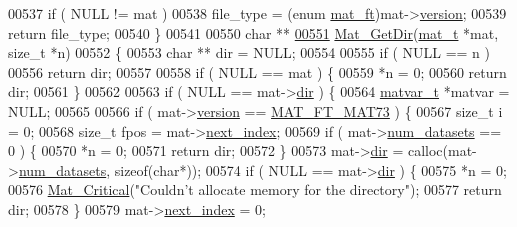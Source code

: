 \begin{DoxyCode}
{{{{{{{{{{{{{{{{{{{00537     \textcolor{keywordflow}{if} ( NULL != mat )
00538         file\_type = (\textcolor{keyword}{enum} \hyperlink{group___m_a_t_gad03442b8378999189d510e3745c702b7}{mat\_ft})mat->\hyperlink{struct__mat__t_a729c2bc0afc97485057a5af425635b1a}{version};
00539     \textcolor{keywordflow}{return} file\_type;
00540 \}
00541 
00550 \textcolor{keywordtype}{char} **
\hyperlink{group___m_a_t_ga7c0d94860d782366ab93d9b6b068eaea}{00551} \hyperlink{group___m_a_t_ga7c0d94860d782366ab93d9b6b068eaea}{Mat\_GetDir}(\hyperlink{struct__mat__t}{mat\_t} *mat, \textcolor{keywordtype}{size\_t} *n)
00552 \{
00553     \textcolor{keywordtype}{char} ** dir = NULL;
00554 
00555     \textcolor{keywordflow}{if} ( NULL == n )
00556         \textcolor{keywordflow}{return} dir;
00557 
00558     \textcolor{keywordflow}{if} ( NULL == mat ) \{
00559         *n = 0;
00560         \textcolor{keywordflow}{return} dir;
00561     \}
00562 
00563     \textcolor{keywordflow}{if} ( NULL == mat->\hyperlink{struct__mat__t_a1bc6c604459d0787801d5e53d365684c}{dir} ) \{
00564         \hyperlink{group___m_a_t_structmatvar__t}{matvar\_t} *matvar = NULL;
00565 
00566         \textcolor{keywordflow}{if} ( mat->\hyperlink{struct__mat__t_a729c2bc0afc97485057a5af425635b1a}{version} == \hyperlink{group___m_a_t_ggad03442b8378999189d510e3745c702b7a765c5d1d5038947646260dc82483517e}{MAT\_FT\_MAT73} ) \{
00567             \textcolor{keywordtype}{size\_t} i = 0;
00568             \textcolor{keywordtype}{size\_t} fpos = mat->\hyperlink{struct__mat__t_a0163a12f9735356723bb604992639d9e}{next\_index};
00569             \textcolor{keywordflow}{if} ( mat->\hyperlink{struct__mat__t_af37d0ba323e65edb27ecd5a2f766a3a4}{num\_datasets} == 0 ) \{
00570                 *n = 0;
00571                 \textcolor{keywordflow}{return} dir;
00572             \}
00573             mat->\hyperlink{struct__mat__t_a1bc6c604459d0787801d5e53d365684c}{dir} = calloc(mat->\hyperlink{struct__mat__t_af37d0ba323e65edb27ecd5a2f766a3a4}{num\_datasets}, \textcolor{keyword}{sizeof}(\textcolor{keywordtype}{char}*));
00574             \textcolor{keywordflow}{if} ( NULL == mat->\hyperlink{struct__mat__t_a1bc6c604459d0787801d5e53d365684c}{dir} ) \{
00575                 *n = 0;
00576                 \hyperlink{group__mat__util_gaf51f2bfbb5580f575e4dd79757e2b80c}{Mat\_Critical}(\textcolor{stringliteral}{"Couldn't allocate memory for the directory"});
00577                 \textcolor{keywordflow}{return} dir;
00578             \}
00579             mat->\hyperlink{struct__mat__t_a0163a12f9735356723bb604992639d9e}{next\_index} = 0;
}}}}}}}}}}}}}}}}}}}
\end{DoxyCode}
